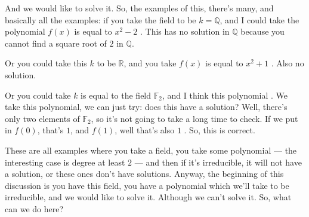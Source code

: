 \begin{hidden}
\end{hidden}

\begin{speech}[00:57:30 - 00:59:04]
And we would like to solve it. So, the examples of this, there's many, and basically all the examples: if you take the field to be $k = \mathbb{Q}$, and I could take the polynomial $f(x)$ is equal to $x^2 - 2$ . This has no solution in $\mathbb{Q}$ because you cannot find a square root of $2$ in $\mathbb{Q}$.

Or you could take this $k$ to be $\mathbb{R}$, and you take $f(x)$ is equal to $x^2 + 1$ . Also no solution.

Or you could take $k$ is equal to the field $\mathbb{F}_2$, and I think this polynomial . We take this polynomial, we can just try: does this have a solution? Well, there's only two elements of $\mathbb{F}_2$, so it's not going to take a long time to check. If we put in $f(0)$, that's $1$, and $f(1)$, well that's also $1$ . So, this is correct.

These are all examples where you take a field, you take some polynomial --- the interesting case is degree at least $2$ --- and then if it's irreducible, it will not have a solution, or these ones don't have solutions. Anyway, the beginning of this discussion is you have this field, you have a polynomial which we'll take to be irreducible, and we would like to solve it. Although we can't solve it. So, what can we do here?
\end{speech}

